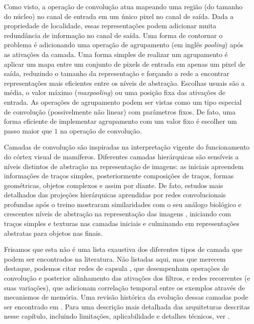 Como visto, a operação de convolução atua mapeando uma região (do tamanho do núcleo) no canal de entrada em um único pixel no canal de saída. Dada a propriedade de localidade, essas representações podem adicionar muita redundância de informação no canal de saída. Uma forma de contornar o problema é adicionando uma operação de agrupamento (em inglês \textit{pooling}) após as ativações da camada. Uma forma simples de realizar um agrupamento é aplicar um mapa entre um conjunto de pixels de entrada em apenas um pixel de saída, reduzindo o tamanho da representação e forçando a rede a encontrar representações mais eficientes entre os níveis de abstração. Escolhas usuais são a média, o valor máximo (\textit{maxpooling}) ou uma posição fixa das ativações de entrada. As operações de agrupamento podem ser vistas como um tipo especial de convolução (possivelmente não linear) com parâmetros fixos. De fato, uma forma eficiente de implementar agrupamento com um valor fixo é escolher um passo maior que $1$ na operação de convolução.

Camadas de convolução são inspiradas na interpretação vigente do funcionamento do córtex visual de mamíferos. Diferentes camadas hierárquicas são sensíveis a níveis distintos de abstração na representação de imagens: as iniciais apreendem informações de traços simples, posteriormente composições de traços, formas geométricas, objetos complexos e assim por diante. De fato, estudos mais detalhados das projeções hierárquicas aprendidas por redes convolucionais profundas após o treino mostraram similaridades com o seu análogo biológico \cite{lee2008sparse} e crescentes níveis de abstração na representação das imagens \cite{Gatys2015, gatys2016image}, iniciando com traços simples e texturas nas camadas iniciais e culminando em representações abstratas para objetos nas finais.

Frisamos que esta não é uma lista exaustiva dos diferentes tipos de camada que podem ser encontrados na literatura. Não listadas aqui, mas que merecem destaque, podemos citar redes de capsula \cite{sabour2017dynamic}, que desempenham operações de convolução e posterior alinhamento das ativações dos filtros, e redes recorrentes (e suas variações), que adicionam correlação temporal entre os exemplos através de mecanismos de memória. Uma revisão histórica da evolução dessas camadas pode ser encontrado em \cite{jurgenReview2015}. Para uma descrição mais detalhada das arquiteturas descritas nesse capítulo, incluindo limitações, aplicabilidade e detalhes técnicos, ver \cite{Goodfellow-et-al-2016}.


